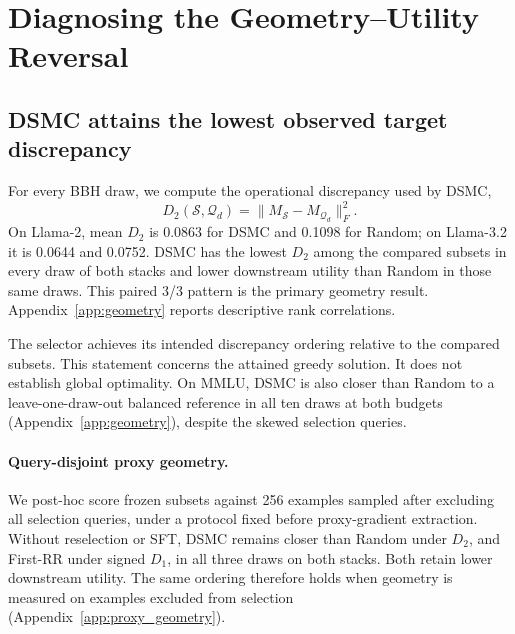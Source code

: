 \documentclass{article}
\newcommand{\method}{\textsc{DSMC}}
\newcommand{\dsecond}{D_2}
\begin{document}
\section{Diagnosing the Geometry--Utility Reversal}
\label{sec:diagnostics}

\subsection{\method{} attains the lowest observed target discrepancy}

For every BBH draw, we compute the operational discrepancy used by \method{},
\begin{equation}
    \dsecond(\mathcal S,\mathcal Q_d)
    = \|M_{\mathcal S}-M_{\mathcal Q_d}\|_F^2.
\end{equation}
On Llama-2, mean $\dsecond$ is 0.0863 for \method{} and 0.1098 for Random;
on Llama-3.2 it is 0.0644 and 0.0752. \method{} has the lowest $\dsecond$
among the compared subsets in every draw of both stacks and lower downstream
utility than Random in those same draws. This paired 3/3 pattern is the primary
geometry result. Appendix~\ref{app:geometry} reports descriptive rank
correlations.

The selector achieves its intended discrepancy ordering relative to the
compared subsets. This statement concerns the attained greedy solution.
It does not establish global optimality. On MMLU, \method{} is also closer than
Random to a leave-one-draw-out balanced reference in all ten draws at both
budgets (Appendix~\ref{app:geometry}), despite the skewed selection queries.

\paragraph{Query-disjoint proxy geometry.}
We post-hoc score frozen subsets against 256 examples sampled after excluding
all selection queries, under a protocol fixed before proxy-gradient
extraction. Without reselection or SFT, \method{} remains closer than Random
under $\dsecond$, and First-RR under signed $D_1$, in all three draws on both
stacks. Both retain lower downstream utility. The same ordering therefore
holds when geometry is measured on examples excluded from selection
(Appendix~\ref{app:proxy_geometry}).
\end{document}
